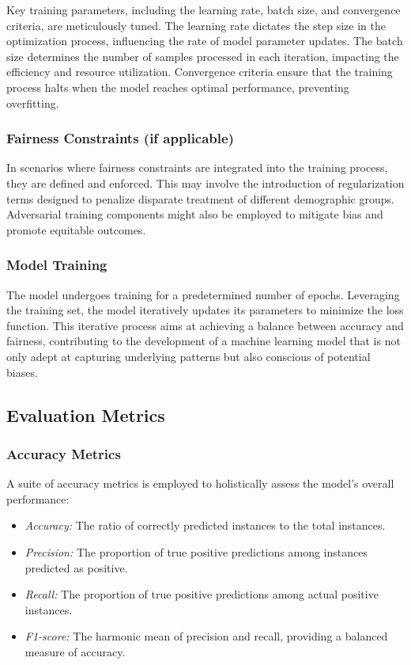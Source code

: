 \documentclass[12pt,a4paper,openright,twoside]{book}
\begin{document}
Key training parameters, including the learning rate, batch size, and convergence criteria, are meticulously tuned. The learning rate dictates the step size in the optimization process, influencing the rate of model parameter updates. The batch size determines the number of samples processed in each iteration, impacting the efficiency and resource utilization. Convergence criteria ensure that the training process halts when the model reaches optimal performance, preventing overfitting.

\subsubsection{Fairness Constraints (if applicable)}

In scenarios where fairness constraints are integrated into the training process, they are defined and enforced. This may involve the introduction of regularization terms designed to penalize disparate treatment of different demographic groups. Adversarial training components might also be employed to mitigate bias and promote equitable outcomes.

\subsubsection{Model Training}

The model undergoes training for a predetermined number of epochs. Leveraging the training set, the model iteratively updates its parameters to minimize the loss function. This iterative process aims at achieving a balance between accuracy and fairness, contributing to the development of a machine learning model that is not only adept at capturing underlying patterns but also conscious of potential biases.

\subsection{Evaluation Metrics}

\subsubsection{Accuracy Metrics}

A suite of accuracy metrics is employed to holistically assess the model's overall performance:

\begin{itemize}
    \item \emph{Accuracy:} The ratio of correctly predicted instances to the total instances.
    
    \item \emph{Precision:} The proportion of true positive predictions among instances predicted as positive.
    
    \item \emph{Recall:} The proportion of true positive predictions among actual positive instances.
    
    \item \emph{F1-score:} The harmonic mean of precision and recall, providing a balanced measure of accuracy.
\end{itemize}
\end{document}
